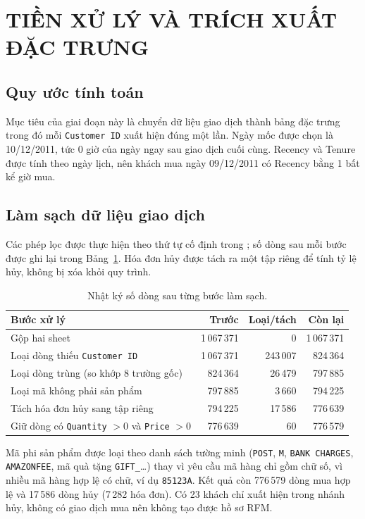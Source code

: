 \documentclass[../report.tex]{subfiles}
\begin{document}
\newpage
\section{TIỀN XỬ LÝ VÀ TRÍCH XUẤT ĐẶC TRƯNG}
\label{sec:preprocess}

\subsection{Quy ước tính toán}

Mục tiêu của giai đoạn này là chuyển dữ liệu giao dịch thành bảng đặc trưng trong đó mỗi \texttt{Customer ID} xuất hiện đúng một lần. Ngày mốc được chọn là 10/12/2011, tức 0 giờ của ngày ngay sau giao dịch cuối cùng. Recency và Tenure được tính theo ngày lịch, nên khách mua ngày 09/12/2011 có Recency bằng 1 bất kể giờ mua.

\subsection{Làm sạch dữ liệu giao dịch}

Các phép lọc được thực hiện theo thứ tự cố định trong ; số dòng sau mỗi bước được ghi lại trong Bảng~\ref{tab:cleaning}. Hóa đơn hủy được tách ra một tập riêng để tính tỷ lệ hủy, không bị xóa khỏi quy trình.

\begin{table}[H]
\centering
\small
\begin{tabularx}{\textwidth}{@{}X rrr@{}}
\toprule
\textbf{Bước xử lý} & \textbf{Trước} & \textbf{Loại/tách} & \textbf{Còn lại} \\
\midrule
Gộp hai sheet & 1\,067\,371 & 0 & 1\,067\,371 \\
Loại dòng thiếu \texttt{Customer ID} & 1\,067\,371 & 243\,007 & 824\,364 \\
Loại dòng trùng (so khớp 8 trường gốc) & 824\,364 & 26\,479 & 797\,885 \\
Loại mã không phải sản phẩm & 797\,885 & 3\,660 & 794\,225 \\
Tách hóa đơn hủy sang tập riêng & 794\,225 & 17\,586 & 776\,639 \\
Giữ dòng có \texttt{Quantity} $>0$ và \texttt{Price} $>0$ & 776\,639 & 60 & 776\,579 \\
\bottomrule
\end{tabularx}
\caption{Nhật ký số dòng sau từng bước làm sạch.}
\label{tab:cleaning}
\end{table}

Mã phi sản phẩm được loại theo danh sách tường minh (\texttt{POST}, \texttt{M}, \texttt{BANK CHARGES}, \texttt{AMAZONFEE}, mã quà tặng \texttt{GIFT\_}\ldots) thay vì yêu cầu mã hàng chỉ gồm chữ số, vì nhiều mã hàng hợp lệ có chữ, ví dụ \texttt{85123A}. Kết quả còn 776\,579 dòng mua hợp lệ và 17\,586 dòng hủy (7\,282 hóa đơn). Có 23 khách chỉ xuất hiện trong nhánh hủy, không có giao dịch mua nên không tạo được hồ sơ RFM.
\end{document}

